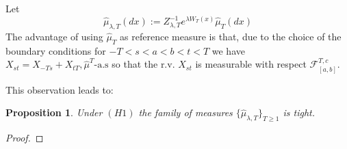 \documentclass[a4paper,12pt,reqno]{amsart}
\newtheorem{proposition}[theorem]{Proposition}
\newcommand{\wmu}{\widehat\mu}
\begin{document}
Let
\begin{equation}
\wmu_{\lambda,T}(dx) := Z_{\lambda,T}^{-1} e^{\lambda W_T(x)} \wmu_T(dx)   
\end{equation}
The advantage of using $\wmu_T$ as reference measure is that, due to
the choice of the boundary conditions for $-T < s < a < b
< t < T$ we have
$
X_{st} = X_{-Ts}+X_{tT}, \wmu^T\text{-a.s}$
so that  the r.v. $X_{st}$ is measurable with respect
$\mathcal{F}^{T,c}_{[a,b]}$.


This observation leads to:
\begin{proposition}
\label{prop:tight2}
 Under $(H1)$
the family of measures $\{\wmu_{\lambda,T} \}_{T \ge 1}$ is tight.
\end{proposition}

\begin{proof}


\end{proof}
\end{document}
